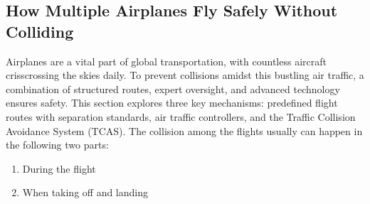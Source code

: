 \documentclass[math,code]{amznotes}
\theoremstyle{remark}
\begin{document}
\subsection{How Multiple Airplanes Fly Safely Without Colliding}
Airplanes are a vital part of global transportation, with countless aircraft crisscrossing the skies daily. To prevent collisions amidst this bustling air traffic, a combination of structured routes, expert oversight, and advanced technology ensures safety. This section explores three key mechanisms: predefined flight routes with separation standards, air traffic controllers, and the Traffic Collision Avoidance System (TCAS). The collision among the flights usually can happen in the following two parts:
\begin{enumerate}
    \item During the flight
    \item When taking off and landing
\end{enumerate}
\end{document}
